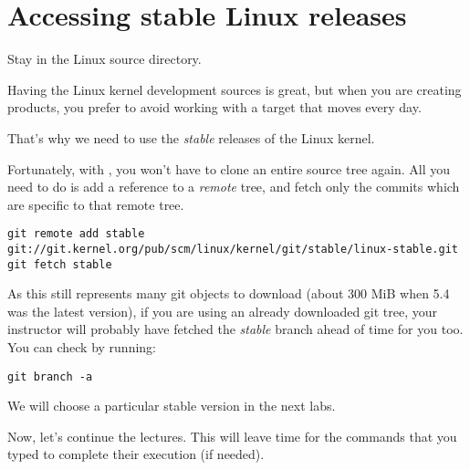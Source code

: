\section{Accessing stable Linux releases}

Stay in the Linux source directory.

Having the Linux kernel development sources is great, but when you are
creating products, you prefer to avoid working with a target that moves
every day.

That's why we need to use the {\em stable} releases of the Linux
kernel.

Fortunately, with , you won't have to clone an entire source
tree again. All you need to do is add a reference to a {\em remote}
tree, and fetch only the commits which are specific to that remote tree.

{\small
\begin{verbatim}
git remote add stable git://git.kernel.org/pub/scm/linux/kernel/git/stable/linux-stable.git
git fetch stable
\end{verbatim}
}

As this still represents many git objects to download (about 300 MiB when 5.4 was
the latest version), if you are using an already downloaded git tree,
your instructor will probably have fetched the {\em stable} branch ahead
of time for you too. You can check by running:

\begin{verbatim}
git branch -a
\end{verbatim}

We will choose a particular stable version in the next labs.

Now, let's continue the lectures. This will leave time for the commands
that you typed to complete their execution (if needed).
